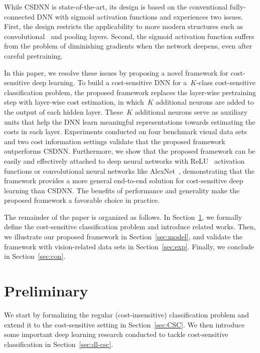\documentclass[a4paper]{article}
\begin{document}
  While CSDNN is state-of-the-art, its design is based on the conventional fully-connected DNN with sigmoid activation functions and experiences two issues.
  First, the design restricts the applicability to more modern structures such as convolutional~\cite{lecun1998gradient,krizhevsky2012imagenet} and pooling layers.
  Second, the sigmoid activation function suffers from the problem of diminishing gradients when the network deepens, even after careful pretraining.

  In this paper, we resolve these issues by proposing a novel framework for cost-sensitive deep learning.
  To build a cost-sensitive DNN for a~$K$-class cost-sensitive classification problem, the proposed framework replaces the layer-wise pretraining step with layer-wise cost estimation, in which~$K$ additional neurons are added to the output of each hidden layer.
  These~$K$ additional neurons serve as auxiliary units that help the DNN learn meaningful representations towards estimating the costs in each layer.
  Experiments conducted on four benchmark visual data sets and two cost information settings validate that the proposed framework outperforms CSDNN.
  Furthermore, we show that the proposed framework can be easily and effectively attached to deep neural networks with ReLU~\cite{nair2010rectified} activation functions or convolutional neural networks like AlexNet~\cite{krizhevsky2012imagenet}, demonstrating that the framework provides a more general end-to-end solution for cost-sensitive deep learning than CSDNN.
  The benefits of performance and generality make the proposed framework a favorable choice in practice.

  The remainder of the paper is organized as follows.
  In Section~\ref{sec:pre}, we formally define the cost-sensitive classification problem and introduce related works.
  Then, we illustrate our proposed framework in Section~\ref{sec:model}, and validate the framework with vision-related data sets in Section~\ref{sec:exp}.
  Finally, we conclude in Section~\ref{sec:con}.


\section{Preliminary}
  \label{sec:pre}
  We start by formalizing the regular (cost-insensitive) classification problem and extend it to the cost-sensitive setting in Section~\ref{sec:CSC}.
  We then introduce some important deep learning research conducted to tackle cost-sensitive classification in Section~\ref{sec:dl-csc}.
\end{document}
